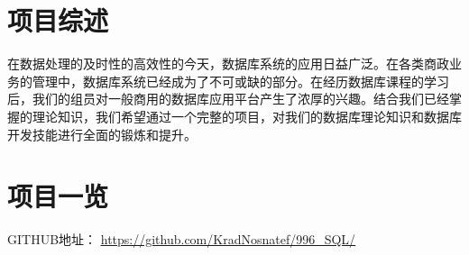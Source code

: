 \documentclass[../report.tex]{subfiles}
\begin{document}
\section{项目综述}

在数据处理的及时性的高效性的今天，数据库系统的应用日益广泛。在各类商政业务的管理中，数据库系统已经成为了不可或缺的部分。在经历数据库课程的学习后，我们的组员对一般商用的数据库应用平台产生了浓厚的兴趣。结合我们已经掌握的理论知识，我们希望通过一个完整的项目，对我们的数据库理论知识和数据库开发技能进行全面的锻炼和提升。

\section {项目一览}

GITHUB地址： \href{https://github.com/KradNosnatef/996_SQL/}{\underline{https://github.com/KradNosnatef/996\_SQL/}}
\end{document}
